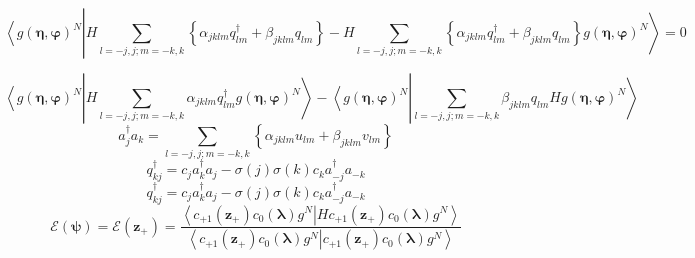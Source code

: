 \documentclass[aps,preprint]{revtex4}%
\begin{document}
\begin{equation}
\left\langle g\left(  \mathbf{\eta},\mathbf{\varphi}\right)  ^{N}\right.
\left\vert H\sum_{l=-j,j;m=-k,k}\left\{  \alpha_{jklm}q_{lm}^{\dagger}%
+\beta_{jklm}q_{lm}\right\}  -H\sum_{l=-j,j;m=-k,k}\left\{  \alpha
_{jklm}q_{lm}^{\dagger}+\beta_{jklm}q_{lm}\right\}  g\left(  \mathbf{\eta
},\mathbf{\varphi}\right)  ^{N}\right\rangle =0
\end{equation}
%

\begin{equation}
\left\langle g\left(  \mathbf{\eta},\mathbf{\varphi}\right)  ^{N}\right.
\left\vert H\sum_{l=-j,j;m=-k,k}\alpha_{jklm}q_{lm}^{\dagger}g\left(
\mathbf{\eta},\mathbf{\varphi}\right)  ^{N}\right\rangle -\left\langle
g\left(  \mathbf{\eta},\mathbf{\varphi}\right)  ^{N}\right.  \left\vert
\sum_{l=-j,j;m=-k,k}\beta_{jklm}q_{lm}Hg\left(  \mathbf{\eta},\mathbf{\varphi
}\right)  ^{N}\right\rangle
\end{equation}%
\begin{equation}
a_{j}^{\dagger}a_{k}=\sum_{l=-j,j;m=-k,k}\left\{  \alpha_{jklm}u_{lm}%
+\beta_{jklm}v_{lm}\right\}
\end{equation}%
\begin{equation}
q_{kj}^{\dagger}=c_{j}a_{k}^{\dagger}a_{j}-\sigma\left(  j\right)
\sigma\left(  k\right)  c_{k}a_{-j}^{\dagger}a_{-k}%
\end{equation}%
\begin{equation}
q_{kj}^{\dagger}=c_{j}a_{k}^{\dagger}a_{j}-\sigma\left(  j\right)
\sigma\left(  k\right)  c_{k}a_{-j}^{\dagger}a_{-k}%
\end{equation}%
\begin{equation}
\mathcal{E}\left(  \mathbf{\psi}\right)  =\mathcal{E}\left(  \mathbf{z}%
_{+}\right)  =\frac{\left\langle c_{+1}\left(  \mathbf{z}_{+}\right)
c_{0}\left(  \mathbf{\lambda}\right)  g^{N}\right.  \left\vert Hc_{+1}\left(
\mathbf{z}_{+}\right)  c_{0}\left(  \mathbf{\lambda}\right)  g^{N}%
\right\rangle }{\left\langle c_{+1}\left(  \mathbf{z}_{+}\right)  c_{0}\left(
\mathbf{\lambda}\right)  g^{N}\right.  \left\vert c_{+1}\left(  \mathbf{z}%
_{+}\right)  c_{0}\left(  \mathbf{\lambda}\right)  g^{N}\right\rangle }%
\end{equation}%
\end{document}
